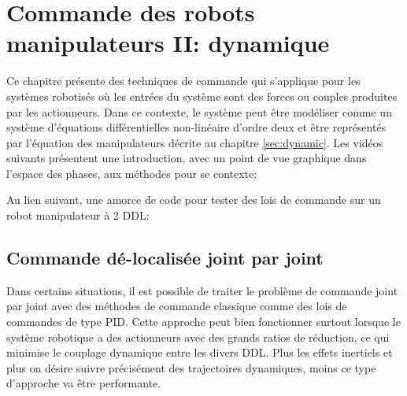 \chapter{Commande des robots manipulateurs II: dynamique}
\label{sec:robotcontroldynamic}

Ce chapitre présente des techniques de commande qui s'applique pour les systèmes robotisés où les entrées du système sont des forces ou couples produites par les actionneurs. Dans ce contexte, le système peut être modéliser comme un système d'équations différentielles non-linéaire d'ordre deux et être représentés par l'équation des manipulateurs décrite au chapitre \ref{sec:dynamic}.  Les vidéos suivants présentent une introduction, avec un point de vue graphique dans l'espace des phases, aux méthodes pour se contexte:




Au lien suivant, une amorce de code pour tester des lois de commande sur un robot manipulateur à 2 DDL:




\newpage
\section{Commande dé-localisée joint par joint}

Dans certains situations, il est possible de traiter le problème de commande joint par joint avec des méthodes de commande classique comme des lois de commandes de type PID. Cette approche peut bien fonctionner surtout lorsque le système robotique a des actionneurs avec des grands ratios de réduction, ce qui minimise le couplage dynamique entre les divers DDL. Plus les effets inertiels et plus on désire suivre précisément des trajectoires dynamiques, moins ce type d'approche va être performante.

